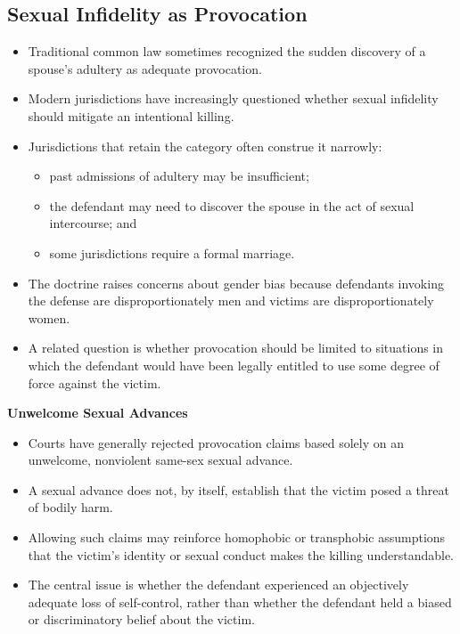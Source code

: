 \documentclass[11pt]{tex/lawoutline}
\begin{document}
\subsection{Sexual Infidelity as Provocation}

\begin{itemize}
    \item Traditional common law sometimes recognized the sudden discovery of a spouse's adultery as adequate provocation.
    \item Modern jurisdictions have increasingly questioned whether sexual infidelity should mitigate an intentional killing.
    \item Jurisdictions that retain the category often construe it narrowly:
    \begin{itemize}
        \item past admissions of adultery may be insufficient;
        \item the defendant may need to discover the spouse in the act of sexual intercourse; and
        \item some jurisdictions require a formal marriage.
    \end{itemize}
    \item The doctrine raises concerns about gender bias because defendants invoking the defense are disproportionately men and victims are disproportionately women.
    \item A related question is whether provocation should be limited to situations in which the defendant would have been legally entitled to use some degree of force against the victim.
\end{itemize}


\textbf{Unwelcome Sexual Advances}

\begin{itemize}
    \item Courts have generally rejected provocation claims based solely on an unwelcome, nonviolent same-sex sexual advance.
    \item A sexual advance does not, by itself, establish that the victim posed a threat of bodily harm.
    \item Allowing such claims may reinforce homophobic or transphobic assumptions that the victim's identity or sexual conduct makes the killing understandable.
    \item The central issue is whether the defendant experienced an objectively adequate loss of self-control, rather than whether the defendant held a biased or discriminatory belief about the victim.
\end{itemize}
\end{document}
